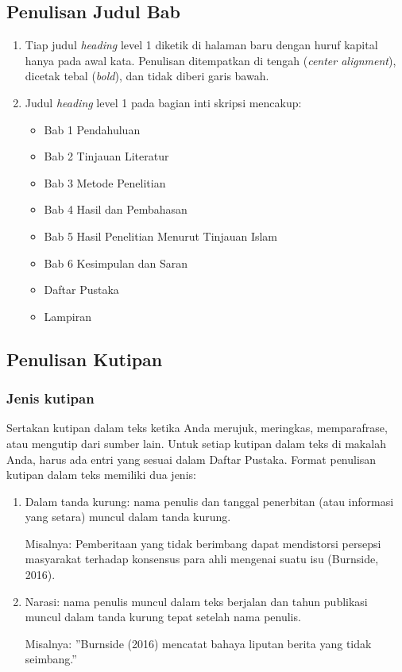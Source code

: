 \documentclass[
  indonesian,
  letterpaper,
]{scrbook}
\providecommand{\tightlist}{%
  \setlength{\itemsep}{0pt}\setlength{\parskip}{0pt}}
\begin{document}
\subsection{Penulisan Judul Bab}\label{penulisan-judul-bab}

\begin{enumerate}
\def\labelenumi{\arabic{enumi}.}
\tightlist
\item
  Tiap judul \emph{heading} level 1 diketik di halaman baru dengan huruf
  kapital hanya pada awal kata. Penulisan ditempatkan di tengah
  (\emph{center alignment}), dicetak tebal (\emph{bold}), dan tidak
  diberi garis bawah.
\item
  Judul \emph{heading} level 1 pada bagian inti skripsi mencakup:

  \begin{itemize}
  \tightlist
  \item
    Bab 1 Pendahuluan
  \item
    Bab 2 Tinjauan Literatur
  \item
    Bab 3 Metode Penelitian
  \item
    Bab 4 Hasil dan Pembahasan
  \item
    Bab 5 Hasil Penelitian Menurut Tinjauan Islam
  \item
    Bab 6 Kesimpulan dan Saran
  \item
    Daftar Pustaka
  \item
    Lampiran
  \end{itemize}
\end{enumerate}

\subsection{Penulisan Kutipan}\label{penulisan-kutipan}

\subsubsection{Jenis kutipan}\label{jenis-kutipan}

Sertakan kutipan dalam teks ketika Anda merujuk, meringkas,
memparafrase, atau mengutip dari sumber lain. Untuk setiap kutipan dalam
teks di makalah Anda, harus ada entri yang sesuai dalam Daftar Pustaka.
Format penulisan kutipan dalam teks memiliki dua jenis:

\begin{enumerate}
\def\labelenumi{\arabic{enumi}.}
\item
  Dalam tanda kurung: nama penulis dan tanggal penerbitan (atau
  informasi yang setara) muncul dalam tanda kurung.

  Misalnya: Pemberitaan yang tidak berimbang dapat mendistorsi persepsi
  masyarakat terhadap konsensus para ahli mengenai suatu isu (Burnside,
  2016).
\item
  Narasi: nama penulis muncul dalam teks berjalan dan tahun publikasi
  muncul dalam tanda kurung tepat setelah nama penulis.

  Misalnya: ''Burnside (2016) mencatat bahaya liputan berita yang tidak
  seimbang.''
\end{enumerate}
\end{document}
